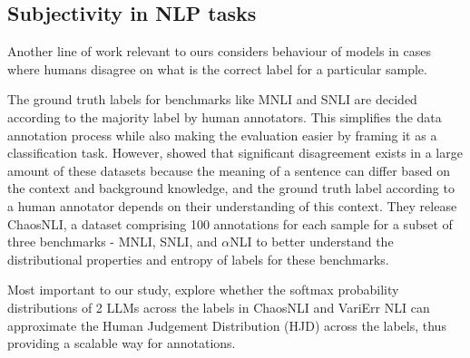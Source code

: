 

\subsection{Subjectivity in NLP tasks}
\label{related:subjectivity}
Another line of work relevant to ours considers behaviour of models in cases where humans disagree on what is the correct label for a particular sample. 

The ground truth labels for benchmarks like MNLI and SNLI are decided according to the majority label by human annotators. 
This simplifies the data annotation process while also making the evaluation easier by framing it as a classification task. 
However, \citet{nie-etal-2020-learn} showed that significant disagreement exists in a large amount of these datasets because the meaning of a sentence can differ based on the context and background knowledge, and the ground truth label according to a human annotator depends on their understanding of this context. 
They release ChaosNLI, a dataset comprising 100 annotations for each sample for a subset of three benchmarks - MNLI, SNLI, and $\alpha$NLI to better understand the distributional properties and entropy of labels for these benchmarks.

Most important to our study, \citet{chen2024seeingbig} explore whether the softmax probability distributions of 2 LLMs across the labels in ChaosNLI \citep{nie-etal-2020-learn} and VariErr NLI \citep{weber-genzel-etal-2024-varierr} can approximate the Human Judgement Distribution (HJD) across the labels, thus providing a scalable way for annotations.
